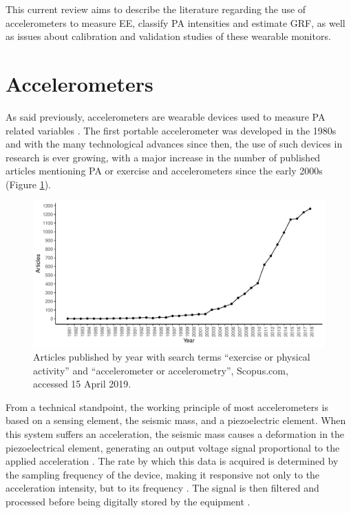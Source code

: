 \documentclass[12pt]{article}
\begin{document}
This current review aims to describe the literature regarding the use of accelerometers to measure EE, classify PA intensities and estimate GRF, as well as issues about calibration and validation studies of these wearable monitors. 

\section*{Accelerometers}

As said previously, accelerometers are wearable devices used to measure PA related variables . The first portable accelerometer was developed in the 1980s  and with the many technological advances since then, the use of such devices in research is ever growing, with a major increase in the number of published articles mentioning PA or exercise and accelerometers since the early 2000s (Figure \ref{art_year}).

\renewcommand{\figurename}{Figure}
\begin{figure}[h]
	\includegraphics[width=\linewidth]{figs/fig1.pdf}
	\caption{Articles published by year with search terms ``exercise or physical activity'' and ``accelerometer or accelerometry'', Scopus.com, accessed 15 April 2019.}
	\label{art_year}
\end{figure}

From a technical standpoint, the working principle of most accelerometers is based on a sensing element, the seismic mass, and a piezoelectric element. When this system suffers an acceleration, the seismic mass causes a deformation in the piezoelectrical element, generating an output voltage signal proportional to the applied acceleration . The rate by which this data is acquired is determined by the sampling frequency of the device, making it responsive not only to the acceleration intensity, but to its frequency . The signal is then filtered and processed before being digitally stored by the equipment .
\end{document}
